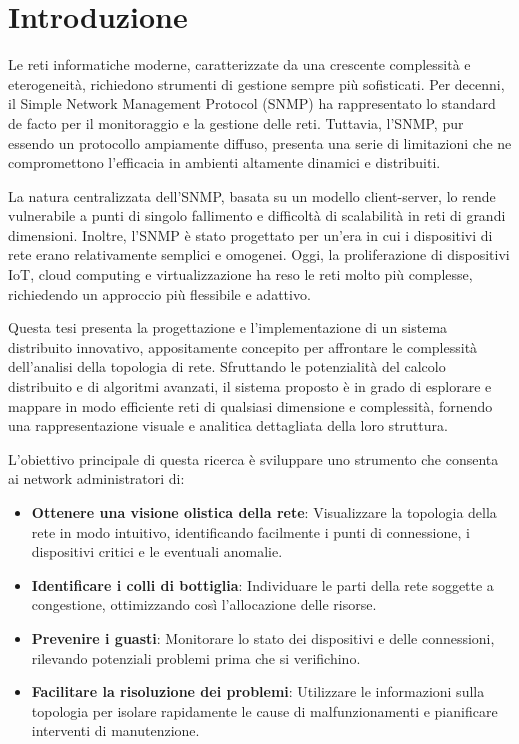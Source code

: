 \documentclass[target=bach,aauheader=,style=]{thud}
\begin{document}
\chapter{Introduzione}
Le reti informatiche moderne, caratterizzate da una crescente complessità e eterogeneità, richiedono strumenti di gestione sempre più sofisticati. Per decenni, il Simple Network Management Protocol (SNMP) ha rappresentato lo standard de facto per il monitoraggio e la gestione delle reti. Tuttavia, l'SNMP, pur essendo un protocollo ampiamente diffuso, presenta una serie di limitazioni che ne compromettono l'efficacia in ambienti altamente dinamici e distribuiti.

La natura centralizzata dell'SNMP, basata su un modello client-server, lo rende vulnerabile a punti di singolo fallimento e difficoltà di scalabilità in reti di grandi dimensioni. Inoltre, l'SNMP è stato progettato per un'era in cui i dispositivi di rete erano relativamente semplici e omogenei. Oggi, la proliferazione di dispositivi IoT, cloud computing e virtualizzazione ha reso le reti molto più complesse, richiedendo un approccio più flessibile e adattivo.

Questa tesi presenta la progettazione e l'implementazione di un sistema distribuito innovativo, appositamente concepito per affrontare le complessità dell'analisi della topologia di rete. Sfruttando le potenzialità del calcolo distribuito e di algoritmi avanzati, il sistema proposto è in grado di esplorare e mappare in modo efficiente reti di qualsiasi dimensione e complessità, fornendo una rappresentazione visuale e analitica dettagliata della loro struttura.

L'obiettivo principale di questa ricerca è sviluppare uno strumento che consenta ai network administratori di:

\begin{itemize}
  \item \textbf{Ottenere una visione olistica della rete}: Visualizzare la topologia della rete in modo intuitivo, identificando facilmente i punti di connessione, i dispositivi critici e le eventuali anomalie.
  \item \textbf{Identificare i colli di bottiglia}: Individuare le parti della rete soggette a congestione, ottimizzando così l'allocazione delle risorse.
  \item \textbf{Prevenire i guasti}: Monitorare lo stato dei dispositivi e delle connessioni, rilevando potenziali problemi prima che si verifichino.
  \item \textbf{Facilitare la risoluzione dei problemi}: Utilizzare le informazioni sulla topologia per isolare rapidamente le cause di malfunzionamenti e pianificare interventi di manutenzione.
\end{itemize}
\end{document}
